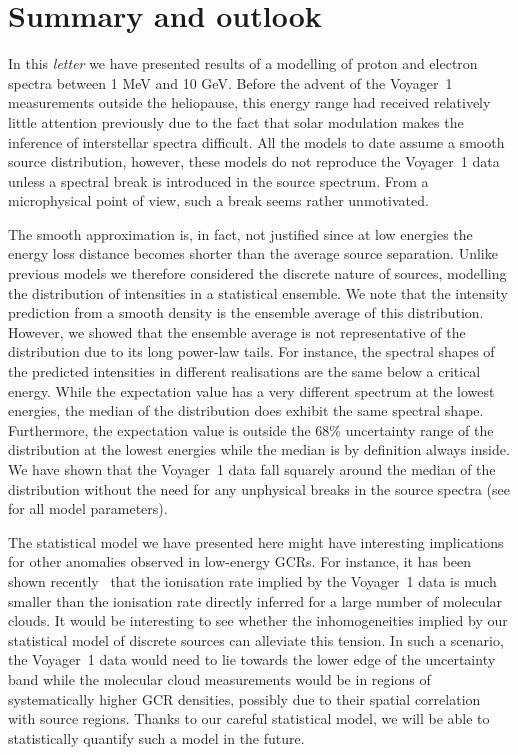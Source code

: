 \documentclass[%
reprint,
amsmath,amssymb,
aps,
superscriptaddress,
preprintnumbers
]{revtex4-2}
\begin{document}
\section{Summary and outlook}

In this \textit{letter} we have presented results of a modelling of proton and electron spectra between 1 MeV and 10 GeV. Before the advent of the Voyager~1 measurements outside the heliopause, this energy range had received relatively little attention previously due to the fact that solar modulation makes the inference of interstellar spectra difficult. All the models to date assume a smooth source distribution, however, these models do not reproduce the Voyager~1 data unless a spectral break is introduced in the source spectrum. From a microphysical point of view, such a break seems rather unmotivated. 

The smooth approximation is, in fact, not justified since at low energies the energy loss distance becomes shorter than the average source separation. Unlike previous models we therefore considered the discrete nature of sources, modelling the distribution of intensities in a statistical ensemble. We note that the intensity prediction from a smooth density is the ensemble average of this distribution. However, we showed that the ensemble average is not representative of the distribution due to its long power-law tails. For instance, the spectral shapes of the predicted intensities in different realisations are the same below a critical energy. While the expectation value has a very different spectrum at the lowest energies, the median of the distribution does exhibit the same spectral shape. Furthermore, the expectation value is outside the $68\%$ uncertainty range of the distribution at the lowest energies while the median is by definition always inside. We have shown that the Voyager~1 data fall squarely around the median of the distribution without the need for any unphysical breaks in the source spectra (see \cite{Note1} for all model parameters). %

The statistical model we have presented here might have interesting implications for other anomalies observed in low-energy GCRs. For instance, it has been shown recently~\cite{phan2018} that the ionisation rate implied by the Voyager~1 data is much smaller than the ionisation rate directly inferred for a large number of molecular clouds. It would be interesting to see whether the inhomogeneities implied by our statistical model of discrete sources can alleviate this tension. In such a scenario, the Voyager~1 data would need to lie towards the lower edge of the uncertainty band while the molecular cloud measurements would be in regions of systematically higher GCR densities, possibly due to their spatial correlation with source regions. Thanks to our careful statistical model, we will be able to statistically quantify such a model in the future.\\
\end{document}
